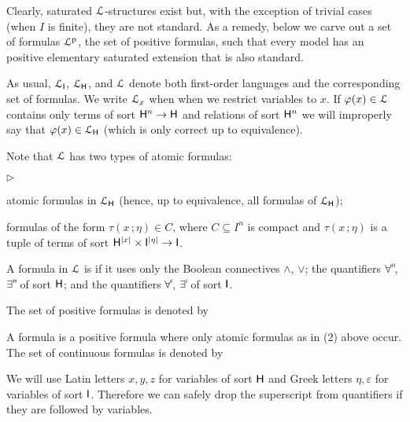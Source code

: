 \documentclass[10pt,oneside]{amsproc}
\newcommand{\mylabel}[1]{{#1}\hfill}
\renewenvironment{itemize}
  {\begin{list}{$\triangleright$}{%
  \setlength{\parskip}{0mm}
  \setlength{\topsep}{.4\baselineskip}
  \setlength{\rightmargin}{0mm}
  \setlength{\listparindent}{0mm}
  \setlength{\itemindent}{0mm}
  \setlength{\labelwidth}{3ex}
  \setlength{\itemsep}{.2\baselineskip}
  \setlength{\parsep}{.2\baselineskip}
  \setlength{\partopsep}{0mm}
  \setlength{\labelsep}{1ex}
  \setlength{\leftmargin}{\labelwidth+\labelsep}
  \let\makelabel\mylabel}}{%
\end{list}}
\renewcommand*{\emph}[1]{%
   \smash{\tikz[baseline]\node[rectangle, fill=teal!25, rounded corners, inner xsep=0.5ex, inner ysep=0.2ex, anchor=base, minimum height = 2.7ex]{\strut #1};}}
\begin{document}

Clearly, saturated ${\EuScript L}$-structures exist but, with the exception of trivial cases (when $I$ is finite), they are not standard.
As a remedy, below we carve out a set of formulas ${\EuScript L}^{\rm p}$, the set of positive formulas, such that every model has an positive elementary saturated extension that is also standard.

As usual, ${\EuScript L}_{\sf I}$, ${\EuScript L}_{\sf H}$, and ${\EuScript L}$ denote both first-order languages and the corresponding set of formulas.
We write ${\EuScript L}_x$ when when we restrict variables to $x$.
If $\varphi(x)\in{\EuScript L}$ contains only terms of sort ${\sf H}^n\to{\sf H}$ and relations of sort ${\sf H}^n$ we will improperly say that $\varphi(x)\in {\EuScript L}_{\sf H}$ (which is only correct up to equivalence).

Note that ${\EuScript L}$ has two types of atomic formulas: 
\begin{itemize}
  \item[1.] atomic formulas in ${\EuScript L}_{\sf H}$ (hence, up to equivalence, all formulas of ${\EuScript L}_{\sf H}$);
  \item[2.] formulas of the form $\tau(x\,;\eta)\in C$, where $C\subseteq I^n$ is compact and $\tau(x\,;\eta)$ is a tuple of terms of sort ${\sf H}^{|x|}\times {\sf I}^{|\eta|}\to {\sf I}$.
\end{itemize}

\begin{definition}\label{def_LL}
  A formula in ${\EuScript L}$ is \emph{positive\/} if it uses only the Boolean connectives $\wedge$, $\vee$; the quantifiers $\forall\raisebox{1.1ex}{\scaleto{\sf H}{.8ex}\kern-.2ex}$, $\exists\raisebox{1.1ex}{\scaleto{\sf H}{.8ex}\kern-.2ex}$ of sort ${\sf H}$; and the quantifiers $\forall\raisebox{1.1ex}{\scaleto{\sf I}{.8ex}\kern-.2ex}$, $\exists\raisebox{1.1ex}{\scaleto{\sf I}{.8ex}\kern-.2ex}$ of sort ${\sf I}$.

  The set of positive formulas is denoted by \emph{${\EuScript L}^{\rm p}$.}

  A \emph{continuous\/} formula is a positive formula where only atomic formulas as in (2) above occur.
  The set of continuous formulas is denoted by \emph{${\EuScript L}^{\rm c}$.}

  We will use Latin letters $x,y,z$ for variables of sort ${\sf H}$ and Greek letters $\eta,\varepsilon$ for variables of sort ${\sf I}$.
  Therefore we can safely drop the superscript from quantifiers if they are followed by variables.
\end{definition}
\end{document}
